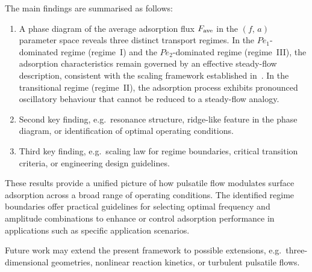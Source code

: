 \documentclass[lineno]{JFM-FLM_Au}
\begin{document}
The main findings are summarised as follows:
\begin{enumerate}
    \item A phase diagram of the average adsorption flux $F_{\rm ave}$ in the $(f,\,a)$ parameter space reveals three distinct transport regimes. In the $Pe_1$-dominated regime (regime~I) and the $Pe_2$-dominated regime (regime~III), the adsorption characteristics remain governed by an effective steady-flow description, consistent with the scaling framework established in~\citep{Huang2024}. In the transitional regime (regime~II), the adsorption process exhibits pronounced oscillatory behaviour that cannot be reduced to a steady-flow analogy.

    \item {\color{green}Second key finding, e.g.\ resonance structure, ridge-like feature in the phase diagram, or identification of optimal operating conditions.}

    \item {\color{green}Third key finding, e.g.\ scaling law for regime boundaries, critical transition criteria, or engineering design guidelines.}
\end{enumerate}

These results provide a unified picture of how pulsatile flow modulates surface adsorption across a broad range of operating conditions. The identified regime boundaries offer practical guidelines for selecting optimal frequency and amplitude combinations to enhance or control adsorption performance in applications such as {\color{green}specific application scenarios}.

Future work may extend the present framework to {\color{green}possible extensions, e.g.\ three-dimensional geometries, nonlinear reaction kinetics, or turbulent pulsatile flows}.





\end{document}
